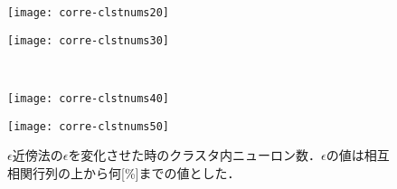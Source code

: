 \begin{figure}[htbp]
    \begin{minipage}{0.49\hsize}
			\begin{center}
					\texttt{[image: corre-clstnums20]}
			\end{center}
		\end{minipage}
    \begin{minipage}{0.49\hsize}
			\begin{center}
					\texttt{[image: corre-clstnums30]}
			\end{center}
		\end{minipage}\\
    \begin{minipage}{0.49\hsize}
			\begin{center}
					\texttt{[image: corre-clstnums40]}
			\end{center}
		\end{minipage}
    \begin{minipage}{0.49\hsize}
			\begin{center}
					\texttt{[image: corre-clstnums50]}
			\end{center}
		\end{minipage}
		\label{fig:corre-clstnums}
		\caption{$\epsilon$近傍法の$\epsilon$を変化させた時のクラスタ内ニューロン数．$\epsilon$の値は相互相関行列の上から何[\%]までの値とした．}
\end{figure}
